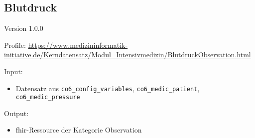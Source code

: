 \subsection{
Blutdruck} 
\noindent Version 1.0.0

\noindent Profile: \url{https://www.medizininformatik-initiative.de/Kerndatensatz/Modul_Intensivmedizin/BlutdruckObservation.html}

\noindent Input:
\begin{itemize}
	\item Datensatz aus \texttt{co6\_config\_variables}, \texttt{co6\_medic\_patient}, \\ \texttt{co6\_medic\_pressure}
\end{itemize}
Output:
\begin{itemize}
        \item \ac{fhir}-Ressource der Kategorie \glqq Observation\grqq{}
\end{itemize}
